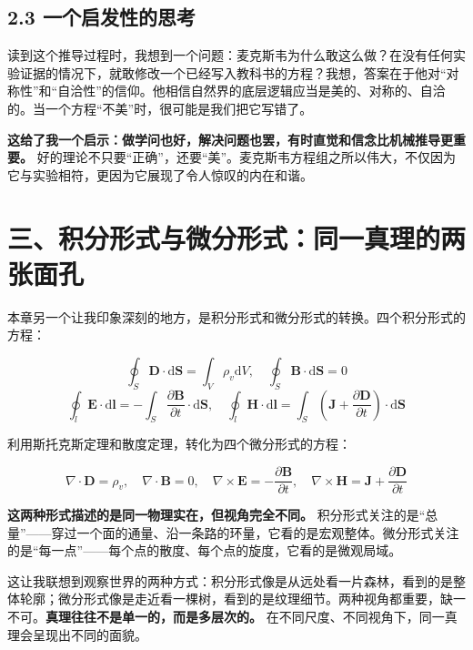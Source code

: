 \documentclass[12pt,a4paper]{ctexart}
\begin{document}
\subsection*{2.3 一个启发性的思考}

读到这个推导过程时，我想到一个问题：麦克斯韦为什么敢这么做？在没有任何实验证据的情况下，就敢修改一个已经写入教科书的方程？我想，答案在于他对“对称性”和“自洽性”的信仰。他相信自然界的底层逻辑应当是美的、对称的、自洽的。当一个方程“不美”时，很可能是我们把它写错了。

\textbf{这给了我一个启示：做学问也好，解决问题也罢，有时直觉和信念比机械推导更重要。} 好的理论不只要“正确”，还要“美”。麦克斯韦方程组之所以伟大，不仅因为它与实验相符，更因为它展现了令人惊叹的内在和谐。

\section*{三、积分形式与微分形式：同一真理的两张面孔}

本章另一个让我印象深刻的地方，是积分形式和微分形式的转换。四个积分形式的方程：

\begin{equation}
\oint_S \mathbf{D} \cdot \mathrm{d}\mathbf{S} = \int_V \rho_v \mathrm{d}V, \quad
\oint_S \mathbf{B} \cdot \mathrm{d}\mathbf{S} = 0
\end{equation}
\begin{equation}
\oint_l \mathbf{E} \cdot \mathrm{d}\mathbf{l} = -\int_S \frac{\partial \mathbf{B}}{\partial t} \cdot \mathrm{d}\mathbf{S}, \quad
\oint_l \mathbf{H} \cdot \mathrm{d}\mathbf{l} = \int_S \left( \mathbf{J} + \frac{\partial \mathbf{D}}{\partial t} \right) \cdot \mathrm{d}\mathbf{S}
\end{equation}

利用斯托克斯定理和散度定理，转化为四个微分形式的方程：

\begin{equation}
\nabla \cdot \mathbf{D} = \rho_v, \quad
\nabla \cdot \mathbf{B} = 0, \quad
\nabla \times \mathbf{E} = -\frac{\partial \mathbf{B}}{\partial t}, \quad
\nabla \times \mathbf{H} = \mathbf{J} + \frac{\partial \mathbf{D}}{\partial t}
\end{equation}

\textbf{这两种形式描述的是同一物理实在，但视角完全不同。} 积分形式关注的是“总量”——穿过一个面的通量、沿一条路的环量，它看的是宏观整体。微分形式关注的是“每一点”——每个点的散度、每个点的旋度，它看的是微观局域。

这让我联想到观察世界的两种方式：积分形式像是从远处看一片森林，看到的是整体轮廓；微分形式像是走近看一棵树，看到的是纹理细节。两种视角都重要，缺一不可。\textbf{真理往往不是单一的，而是多层次的。} 在不同尺度、不同视角下，同一真理会呈现出不同的面貌。
\end{document}
